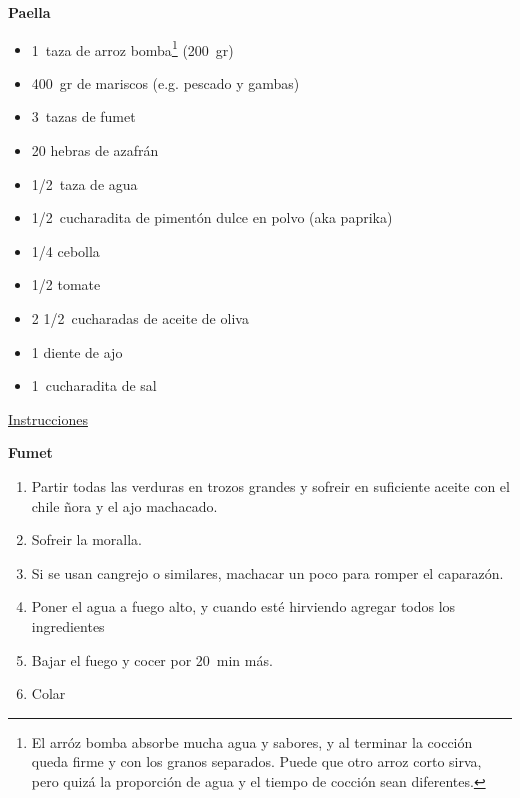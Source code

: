\textbf{Paella}
\begin{itemize}
\item \SI{1}{taza} de arroz bomba\footnote{El arróz bomba absorbe mucha agua y sabores, y al terminar la cocción queda firme y con los granos separados. Puede que otro arroz corto sirva, pero quizá la proporción de agua y el tiempo de cocción sean diferentes.} (\SI{200}{gr})
\item \SI{400}{gr} de mariscos (e.g. pescado y gambas)
\item \SI{3}{tazas} de fumet
\item 20 hebras de azafrán
\item \SI{1/2}{taza} de agua
\item \SI{1/2}{cucharadita} de pimentón dulce en polvo (aka paprika)
\item \num{1/4} cebolla
\item \num{1/2} tomate
\item 2 \SI{1/2}{cucharadas} de aceite de oliva
\item 1 diente de ajo
\item \SI{1}{cucharadita} de sal
\end{itemize}

\underline{Instrucciones}

\textbf{Fumet}
\begin{enumerate}
\item Partir todas las verduras en trozos grandes y sofreir en suficiente aceite con el chile ñora y el ajo machacado.
\item Sofreir la moralla.
\item Si se usan cangrejo o similares, machacar un poco para romper el caparazón.
\item Poner el agua a fuego alto, y cuando esté hirviendo agregar todos los ingredientes
\item Bajar el fuego y cocer por \SI{20}{min} más.
\item Colar
\end{enumerate}

